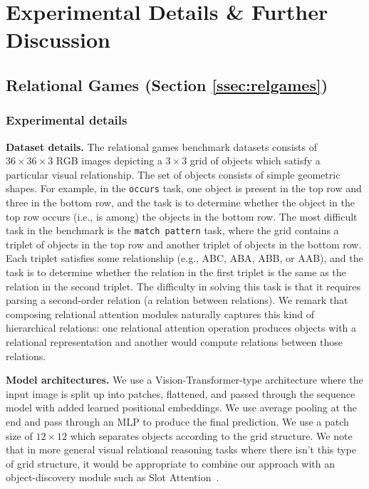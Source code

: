 \section{Experimental Details \& Further Discussion}\label{sec:appendix_experimental_details}

\subsection{Relational Games (Section \ref{ssec:relgames})}\label{ssec:appendxi_relgames}

\subsubsection*{Experimental details}

\textbf{Dataset details.} The relational games benchmark datasets consists of $36 \times 36 \times 3$ RGB images depicting a $3 \times 3$ grid of objects which satisfy a particular visual relationship. The set of objects consists of simple geometric shapes. For example, in the \texttt{occurs} task, one object is present in the top row and three in the bottom row, and the task is to determine whether the object in the top row occurs (i.e., is among) the objects in the bottom row. The most difficult task in the benchmark is the \texttt{match pattern} task, where the grid contains a triplet of objects in the top row and another triplet of objects in the bottom row. Each triplet satisfies some relationship (e.g., ABC, ABA, ABB, or AAB), and the task is to determine whether the relation in the first triplet is the same as the relation in the second triplet. The difficulty in solving this task is that it requires parsing a second-order relation (a relation between relations). We remark that composing relational attention modules naturally captures this kind of hierarchical relations: one relational attention operation produces objects with a relational representation and another would compute relations between those relations.


\textbf{Model architectures.} We use a Vision-Transformer-type architecture where the input image is split up into patches, flattened, and passed through the sequence model with added learned positional embeddings. We use average pooling at the end and pass through an MLP to produce the final prediction. We use a patch size of $12 \times 12$ which separates objects according to the grid structure. We note that in more general visual relational reasoning tasks where there isn't this type of grid structure, it would be appropriate to combine our approach with an object-discovery module such as Slot Attention~\citep{locatelloObjectCentricLearningSlot2020}.

